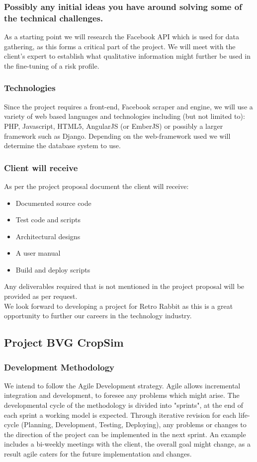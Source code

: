 \documentclass{article}
\begin{document}
	\subsubsection{Possibly any initial ideas you have around solving some of the technical challenges.}
	As a starting point we will research the Facebook API which is used for data gathering, as this forms a critical part of the project. We will meet with the client's expert to establish what qualitative information might further be used in the fine-tuning of a risk profile.
	
	\subsubsection{Technologies}
	Since the project requires a front-end, Facebook scraper and engine, we will use a variety of web based languages and technologies including (but not limited to): PHP, Javascript, HTML5, AngularJS (or EmberJS) or possibly a larger framework such as Django. Depending on the web-framework used we will determine the database system to use. 
	
	\subsubsection{Client will receive}
	As per the project proposal document the client will receive:
	\begin{itemize}
		\item Documented source code
		\item Test code and scripts
		\item Architectural designs
		\item A user manual
		\item Build and deploy scripts
	\end{itemize}
	Any deliverables required that is not mentioned in the project proposal will be provided as per request.\\
	
	We look forward to developing a project for Retro Rabbit as this is a great opportunity to further our careers in the technology industry.
	
	\subsection{Project BVG CropSim}
	\subsubsection{Development Methodology}
	We intend to follow the Agile Development strategy. Agile allows incremental integration and development, to foresee any problems which might arise. The developmental cycle of the methodology is divided into "sprints", at the end of each sprint a working model is expected. Through iterative revision for each life-cycle (Planning, Development, Testing, Deploying), any problems or changes to the direction of the project can be implemented in the next sprint. An example includes a bi-weekly meetings with the client, the overall goal might change, as a result agile caters for the future implementation and changes.
	
\end{document}
